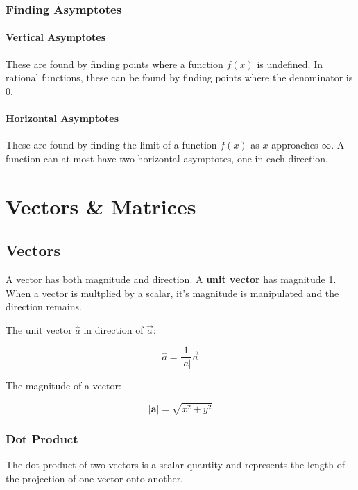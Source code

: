 \subsubsection{Finding Asymptotes} %

\paragraph{Vertical Asymptotes} These are found by finding points where a function \(f(x)\) is undefined. In rational functions, these can be found by finding points where the denominator is 0.

\paragraph{Horizontal Asymptotes} These are found by finding the limit of a function \(f(x)\) as \(x\) approaches \( \infty \). A function can at most have two horizontal asymptotes, one in each direction.

\section{Vectors \& Matrices}

\subsection{Vectors} %

A vector has both magnitude and direction. A \textbf{unit vector} has magnitude 1. When a vector is multplied by a scalar, it's magnitude is manipulated and the direction remains.

The unit vector \(\hat{a}\) in direction of \(\vec{a}\):

\begin{equation}
	\hat{a} = \frac{1}{|a|}\vec{a}
\end{equation}

The magnitude of a vector:

\begin{equation}
	|\mathbf{a}| = \sqrt{x^2 + y^2}
\end{equation}

\subsubsection{Dot Product}
The dot product of two vectors is a scalar quantity and represents the length of the projection of one vector onto another.

